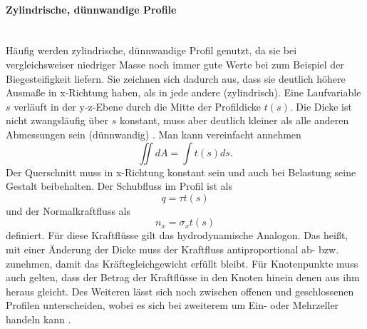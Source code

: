 \paragraph{Zylindrische, dünnwandige Profile}~\\
Häufig werden zylindrische, dünnwandige Profil genutzt, da sie bei vergleichsweiser niedriger Masse noch immer gute Werte bei zum Beispiel der Biegesteifigkeit liefern. Sie zeichnen sich dadurch aus, dass sie deutlich höhere Ausmaße in x-Richtung haben, als in jede andere (zylindrisch). Eine Laufvariable $s$ verläuft in der y-z-Ebene durch die Mitte der Profildicke $t(s)$. Die Dicke ist nicht zwangsläufig über $s$ konstant, muss aber deutlich kleiner als alle anderen Abmessungen sein (dünnwandig) \cite{item15}. Man kann vereinfacht annehmen
\begin{equation}
	\iint dA=\int t(s)ds.
\end{equation} 
Der Querschnitt muss in x-Richtung konstant sein und auch bei Belastung seine Gestalt beibehalten. Der Schubfluss im Profil ist als
\begin{equation}\label{tau}
	q=\tau t(s)
\end{equation}
und der Normalkraftfluss als
\begin{equation}
	n_x=\sigma_x t(s)
\end{equation}
definiert. Für diese Kraftflüsse gilt das hydrodynamische Analogon. Das heißt, mit einer Änderung der Dicke muss der Kraftfluss antiproportional ab- bzw. zunehmen, damit das Kräftegleichgewicht erfüllt bleibt. Für Knotenpunkte muss auch gelten, dass der Betrag der Kraftflüsse in den Knoten hinein denen aus ihm heraus gleicht. Des Weiteren lässt sich noch zwischen offenen und geschlossenen Profilen unterscheiden, wobei es sich bei zweiterem um Ein- oder Mehrzeller handeln kann \cite{item15}.

